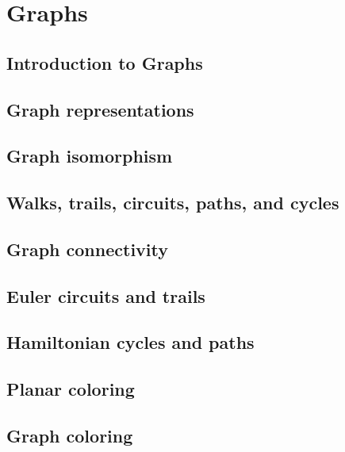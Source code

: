 \section{Graphs}
\subsection{Introduction to Graphs}
\subsection{Graph representations}
\subsection{Graph isomorphism}
\subsection{Walks, trails, circuits, paths, and cycles}
\subsection{Graph connectivity}
\subsection{Euler circuits and trails}
\subsection{Hamiltonian cycles and paths}
\subsection{Planar coloring}
\subsection{Graph coloring}